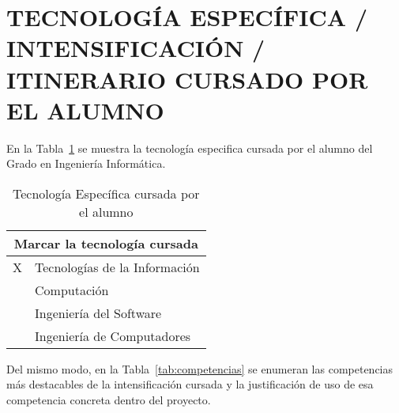 \documentclass{pre-tfg}
\begin{document}
\newpage

\section{TECNOLOGÍA ESPECÍFICA / INTENSIFICACIÓN / ITINERARIO CURSADO POR EL ALUMNO}

En la Tabla~\ref{tab:tec-especifica} se muestra la tecnología especifica cursada por el alumno del Grado en Ingeniería Informática.

\begin{table}[hp]
  \centering
  \caption{Tecnología Específica cursada por el alumno}
  \label{tab:tec-especifica}

  \begin{tabular}{l p{}}
    \multicolumn{2}{c}{\textbf{Marcar la tecnología cursada}} \\
    \hline
    X & Tecnologías de la Información \\
    ~ & Computación                   \\
    ~ & Ingeniería del Software       \\
    ~ & Ingeniería de Computadores    \\ \hline
  \end{tabular}
\end{table}

Del mismo modo, en la Tabla~\ref{tab:competencias} se enumeran las competencias más destacables de la intensificación cursada y la justificación de uso de esa competencia concreta dentro del proyecto.
\end{document}
